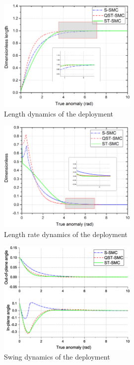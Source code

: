 \documentclass[3p]{elsarticle}
\theoremstyle{plain}
\theoremstyle{remark}
\begin{document}
\begin{figure}
\centering
\includegraphics[width=0.6\textwidth]{paper4_fig3.eps}
\caption{Length dynamics of the deployment}
\label{fig:3}
\end{figure}
\begin{figure}
\centering
\includegraphics[width=0.6\textwidth]{paper4_fig4.eps}
\caption{Length rate dynamics of the deployment}
\label{fig:4}
\end{figure}
\begin{figure}
\centering
\includegraphics[width=0.6\textwidth]{paper4_fig5.eps}
\caption{Swing dynamics of the deployment}
\label{fig:5}
\end{figure}
\end{document}
